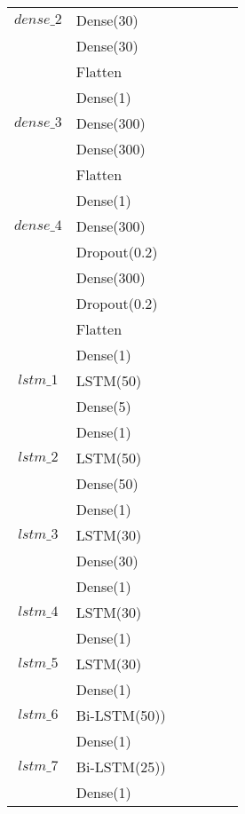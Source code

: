 \begin{longtable}{| c | m{0.58\linewidth} | r | m{0.1\linewidth} |}
    $dense\_2$  & Dense(30)                 \\
                & Dense(30)                 \\
                & Flatten                   \\
                & Dense(1)                  \\ \hline

    $dense\_3$  & Dense(300)                \\
                & Dense(300)                \\
                & Flatten                   \\
                & Dense(1)                  \\ \hline

    $dense\_4$  & Dense(300)                \\
                & Dropout(0.2)              \\
                & Dense(300)                \\
                & Dropout(0.2)              \\
                & Flatten                   \\
                & Dense(1)                  \\ \hline
    $lstm\_1$   & LSTM(50)                  \\
                & Dense(5)                  \\
                & Dense(1)                  \\ \hline

    $lstm\_2$   & LSTM(50)                  \\
                & Dense(50)                 \\
                & Dense(1)                  \\ \hline

    $lstm\_3$   & LSTM(30)                  \\
                & Dense(30)                 \\
                & Dense(1)                  \\ \hline
    $lstm\_4$   & LSTM(30)                  \\
                & Dense(1)                  \\ \hline
    $lstm\_5$   & LSTM(30)                  \\
                & Dense(1)                  \\ \hline
    $lstm\_6$   & Bi-LSTM(50))              \\
                & Dense(1)                  \\ \hline
    $lstm\_7$   & Bi-LSTM(25))              \\
                & Dense(1)                  \\ \hline


\end{longtable}
